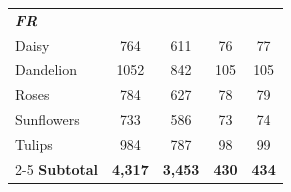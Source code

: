 \begin{table}[t]
\begin{tabular}{l cccc}
		\midrule
		\multicolumn{5}{l}{\textit{\textbf{FR}}} \\
		Daisy      & 764  & 611  & 76  & 77  \\
		Dandelion  & 1052 & 842  & 105 & 105 \\
		Roses      & 784  & 627  & 78  & 79  \\
		Sunflowers & 733  & 586  & 73  & 74  \\
		Tulips     & 984  & 787  & 98  & 99  \\
		\cmidrule(lr){2-5}
		\textbf{Subtotal} & \textbf{4,317} & \textbf{3,453} & \textbf{430} & \textbf{434} \\
		
		\bottomrule
	\end{tabular}
\end{table}